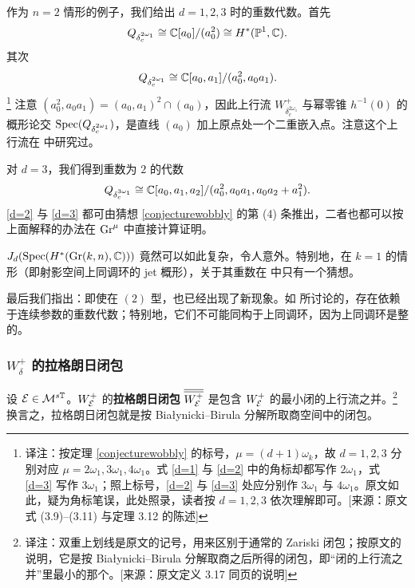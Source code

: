 \begin{remark}
作为 $n=2$ 情形的例子，我们给出 $d=1,2,3$ 时的重数代数。首先
\begin{equation}\label{d=1}
Q_{\delta_c^{2\omega_1}}\cong\mathbb{C}[a_0]/(a_0^2)\cong H^*(\mathbb{P}^1,\mathbb{C}).
\end{equation}
其次
\begin{equation}\label{d=2}
Q_{\delta_c^{2\omega_1}}\cong \mathbb{C}[a_0,a_1]/(a_0^2,a_0a_1).
\end{equation}
\footnote{译注：按定理 \ref{conjecturewobbly} 的标号，$\mu=(d+1)\omega_k$，故 $d=1,2,3$ 分别对应 $\mu=2\omega_1,3\omega_1,4\omega_1$。式 \eqref{d=1} 与 \eqref{d=2} 中的角标却都写作 $2\omega_1$，式 \eqref{d=3} 写作 $3\omega_1$；照上标号，\eqref{d=2} 与 \eqref{d=3} 处应分别作 $3\omega_1$ 与 $4\omega_1$。原文如此，疑为角标笔误，此处照录，读者按 $d=1,2,3$ 依次理解即可。[来源：原文式 (3.9)--(3.11) 与定理 3.12 的陈述]}
注意 $(a_0^2,a_0a_1)=(a_0,a_1)^2\cap (a_0)$，因此上行流 $W^+_{\delta_c^{2\omega_1}}$ 与幂零锥 $h^{-1}(0)$ 的概形论交 $\operatorname{Spec}(Q_{\delta_c^{2\omega_1}})$，是直线 $(a_0)$ 加上原点处一个二重嵌入点。注意这个上行流在 \cite[\S 8.2]{hausel-hitchin} 中研究过。

对 $d=3$，我们得到重数为 $2$ 的代数
\begin{equation}\label{d=3}
Q_{\delta_c^{3\omega_1}}\cong \mathbb{C}[a_0,a_1,a_2]/(a_0^2,a_0a_1,a_0a_2+a_1^2).
\end{equation}
\eqref{d=2} 与 \eqref{d=3} 都可由猜想 \ref{conjecturewobbly} 的第 (4) 条推出，二者也都可以按上面解释的办法在 $\textnormal{Gr}^\mu$ 中直接计算证明。
\end{remark}

\begin{remark}
$J_d(\operatorname{Spec}(H^*(\textnormal{Gr}(k,n),\mathbb{C})))$ 竟然可以如此复杂，令人意外。特别地，在 $k=1$ 的情形（即射影空间上同调环的 jet 概形），关于其重数在 \cite[Conjecture III.21]{yuenthesis} 中只有一个猜想。
\end{remark}

\begin{remark}
最后我们指出：即使在 $(2)$ 型，也已经出现了新现象。如 \cite[\S 5.4]{hitchin4} 所讨论的，存在依赖于连续参数的重数代数；特别地，它们不可能同构于上同调环，因为上同调环是整的。
\end{remark}

\subsubsection{$W^+_\delta$ 的拉格朗日闭包}

\begin{definition}
设 ${\mathcal E}\in {\mathcal{M}}^{s{\mathbb{T}}}$。$W^+_{\mathcal E}$ 的\textbf{拉格朗日闭包} $\overline{\overline{W^+_{\mathcal E}}}$ 是包含 $W^+_{\mathcal E}$ 的最小闭的上行流之并。\footnote{译注：双重上划线是原文的记号，用来区别于通常的 Zariski 闭包；按原文的说明，它是按 Białynicki--Birula 分解取商之后所得的闭包，即“闭的上行流之并”里最小的那个。[来源：原文定义 3.17 同页的说明]}
换言之，拉格朗日闭包就是按 Białynicki--Birula 分解所取商空间中的闭包。
\end{definition}

